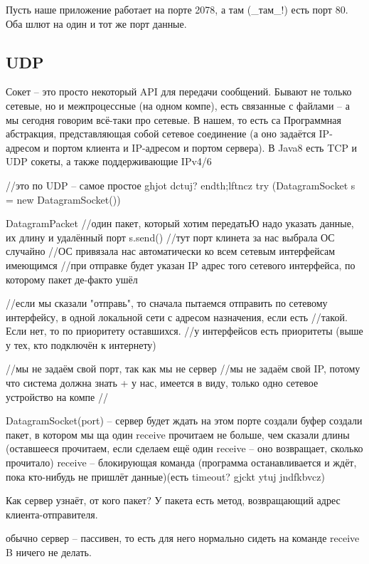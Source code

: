 Пусть наше приложение работает на порте 2078, а там (\_там\_!) есть порт 80.
Оба шлют на один и тот же порт данные.

\subsection{UDP}
Сокет -- это просто некоторый API для передачи сообщений. Бывают не только сетевые, но и межпроцессные (на одном компе),
есть связанные с файлами -- а мы сегодня говорим всё-таки про сетевые.
В нашем, то есть са
Программная абстракция, представляющая собой сетевое соединение (а оно задаётся IP-адресом и портом клиента и IP-адресом и портом сервера).
В Java8 есть TCP и UDP сокеты, а также поддерживающие IPv4/6
\begin{javacode}
//это по UDP -- самое простое ghjot dctuj? endth;lftncz
try (DatagramSocket s = new DatagramSocket()) {
	DatagramPacket //один пакет, который хотим передатьЮ надо указать данные, их длину и удалённый порт
	s.send()
//тут порт клинета за нас выбрала ОС случайно
//ОС привязала нас автоматически ко всем сетевым интерфейсам имеющимся
//при отправке будет указан IP адрес того сетевого интерфейса, по которому пакет де-факто ушёл

//если мы сказали "отправь", то сначала пытаемся отправить по сетевому интерфейсу, в одной локальной сети с адресом назначения, если есть
//такой. Если нет, то по приоритету оставшихся.
//у интерфейсов есть приоритеты (выше у тех, кто подключён к интернету)
}
//мы не задаём свой порт, так как мы не сервер
//мы не задаём свой IP, потому что система должна знать + у нас, имеется в виду, только одно сетевое устройство на компе
//
\end{javacode}

\begin{javacode}
DatagramSocket(port) -- сервер будет ждать на этом порте
создали буфер
создали пакет, в котором мы ща один receive прочитаем не больше, чем сказали длины (оставшееся прочитаем, если сделаем ещё один receive -- оно возвращает, сколько прочитало)
receive -- блокирующая команда (программа останавливается и ждёт, пока кто-нибудь не пришлёт данные)(есть timeout? gjckt ytuj jndfkbvcz)
\end{javacode}

Как сервер узнаёт, от кого пакет? У пакета есть метод, возвращающий адрес клиента-отправителя.

обычно сервер -- пассивен, то есть для него нормально сидеть на команде receive B ничего не делать.



